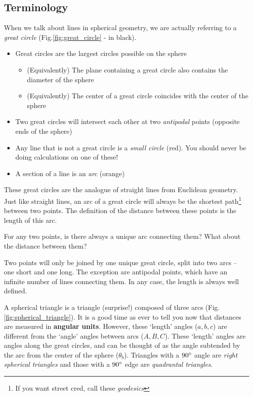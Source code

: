 \documentclass{article}
\begin{document}
\subsection{Terminology}
When we talk about lines in spherical geometry, we are actually referring to a \textit{great circle} (Fig.\;\ref{fig:great_circle} - in black).
\begin{itemize}
    \item Great circles are the largest circles possible on the sphere
    \begin{itemize}
        \item (Equivalently) The plane containing a great circle also contains the diameter of the sphere
        \item (Equivalently) The center of a great circle coincides with the center of the sphere
    \end{itemize}
    \item Two great circles will intersect each other at two \textit{antipodal} points (opposite ends of the sphere)
    \item Any line that is not a great circle is a \textit{small circle} (red). You should never be doing calculations on one of these!
    \item A section of a line is an \textit{arc} (orange)
\end{itemize}
These great circles are the analogue of straight lines from Euclidean geometry. Just like straight lines, an arc of a great circle will always be the shortest path\footnote{If you want street cred, call these \textit{geodesics}} between two points. The definition of the distance between these points is the length of this arc.

\begin{Exercise}
For any two points, is there always a unique arc connecting them? What about the distance between them?
\end{Exercise}
\begin{Answer}
Two points will only be joined by one unique great circle, split into two arcs -- one short and one long. The exception are antipodal points, which have an infinite number of lines connecting them. In any case, the length is always well defined.
\end{Answer}
\medskip


A spherical triangle is a triangle (surprise!) composed of three arcs (Fig.\;\ref{fig:spherical_triangle}). It is a good time as ever to tell you now that distances are measured in \textbf{angular units}. However, these `length' angles ($a, b, c$) are different from the `angle' angles between arcs ($A, B, C$). These `length' angles are angles along the great circles, and can be thought of as the angle subtended by the arc from the center of the sphere ($\theta_b$). Triangles with a $90{}^{\circ}$ angle are \textit{right spherical triangles} and those with a $90{}^{\circ}$ edge are \textit{quadrantal triangles}.
\end{document}
